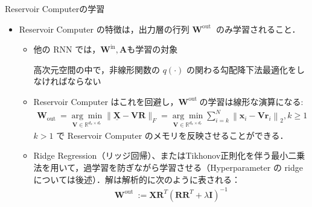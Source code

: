 \begin{frame}{Reservoir Computerの学習}
    \begin{itemize}
        \item Reservoir Computer の特徴は，出力層の行列 $\mathbf{W}^{\text {out }}$ のみ学習されること．\begin{itemize}
            \item 他の RNN では，$\mathbf{W}^{\text {in}}, \mathbf{A}$も学習の対象 
            
            \rightarrow 高次元空間の中で，非線形関数の $q(\cdot)$ の関わる勾配降下法最適化をしなければならない 
            
            \item Reservoir Computer はこれを回避し，$\mathbf{W}^{\text {out }}$の学習は線形な演算になる: 
            \begin{align}
                \mathbf{W}_{\text {out }}=\underset{\mathbf{V} \in \mathbb{R}^{d_x \times d_r}}{\arg \min }\|\underline{\mathbf{X}}-\mathbf{V R}\|_F=\underset{\mathbf{V} \in \mathbb{R}^{d_x \times d_r}}{\arg \min } \sum_{i=k}^N\left\|\mathbf{x}_i-\mathbf{V r}_i\right\|_2, k \geq 1 
            \end{align}
            $k > 1$ で Reservoir Computer のメモリを反映させることができる．
            \item Ridge Regression（リッジ回帰）、またはTikhonov正則化を伴う最小二乗法を用いて，過学習を防ぎながら学習させる（Hyperparameter の ridge については後述）．解は解析的に次のように表される：
            \begin{align}
                \mathbf{W}^{\text {out }}:=\mathbf{X R}^T\left(\mathbf{R R}^T+\lambda \mathbf{I}\right)^{-1}
            \end{align}
        \end{itemize}
    \end{itemize}
\end{frame}

